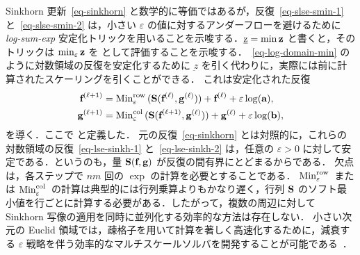 \begin{rem}\label{rem-log-sinkh}
Sinkhorn 更新~\eqref{eq-sinkhorn} と数学的に等価ではあるが，反復~\eqref{eq-slse-smin-1} と~\eqref{eq-slse-smin-2} は，小さい $\varepsilon$ の値に対するアンダーフローを避けるために \emph{log-sum-exp} 安定化トリックを用いることを示唆する．$\underbar{z}=\min \mathrm{\textbf{z}}$ と書くと，そのトリックは $\text{min}_\varepsilon\, \mathrm{\textbf{z}}$ を
として評価することを示唆する．~\eqref{eq-log-domain-min} のように対数領域の反復を安定化するために $\underbar{z}$ を引く代わりに，実際には前に計算されたスケーリングを引くことができる．
これは安定化された反復
\begin{align}
	\label{eq-lse-sinkh-1}\mathrm{\textbf{f}}^{(\ell+1)} &= \text{Min}^{\text{row}}_\varepsilon\,( \mathrm{\textbf{S}}(\mathrm{\textbf{f}}^{(\ell)},\mathrm{\textbf{g}}^{(\ell)}))  + \mathrm{\textbf{f}}^{(\ell)} + \varepsilon\log(\mathrm{\textbf{a}}), \\
	\label{eq-lse-sinkh-2}\mathrm{\textbf{g}}^{(\ell+1)} &= \text{Min}^{\text{col}}_\varepsilon\,( \mathrm{\textbf{S}}(\mathrm{\textbf{f}}^{(\ell+1)},\mathrm{\textbf{g}}^{(\ell)})) + \mathrm{\textbf{g}}^{(\ell)} + \varepsilon \log(\mathrm{\textbf{b}}),
\end{align}
を導く．ここで
と定義した．
元の反復~\eqref{eq-sinkhorn} とは対照的に，これらの対数領域の反復~\eqref{eq-lse-sinkh-1} と~\eqref{eq-lse-sinkh-2} は，任意の $\varepsilon>0$ に対して安定である．というのも，量 $\mathrm{\textbf{S}}(\mathrm{\textbf{f}},\mathrm{\textbf{g}})$ が反復の間有界にとどまるからである．
欠点は，各ステップで $nm$ 回の $\exp$ の計算を必要とすることである．
$\text{Min}^{\text{row}}_\varepsilon\,$ または $\text{Min}^{\text{col}}_\varepsilon\,$ の計算は典型的には行列乗算よりもかなり遅く，行列 $\mathrm{\textbf{S}}$ のソフト最小値を行ごとに計算する必要がある．したがって，複数の周辺に対して Sinkhorn 写像の適用を同時に並列化する効率的な方法は存在しない．
%
小さい次元の Euclid 領域では，疎格子を用いて計算を著しく高速化するために，減衰する $\varepsilon$ 戦略を伴う効率的なマルチスケールソルバを開発することが可能である~\citep{schmitzer2016stabilized}．
\end{rem}




